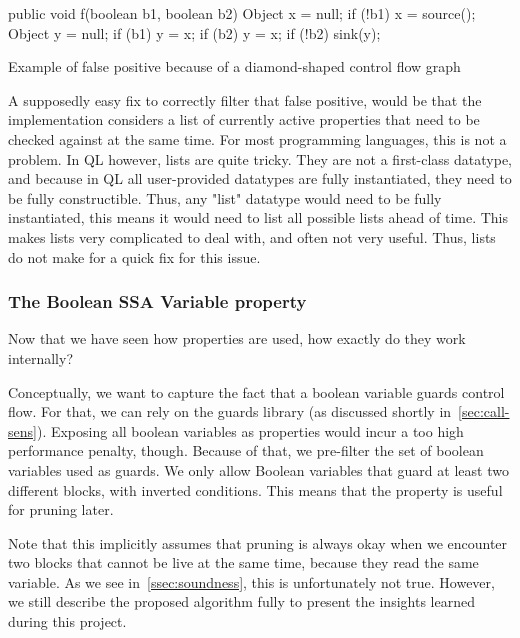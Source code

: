 \begin{listing}
    \begin{javacode}
public void f(boolean b1, boolean b2) {
    Object x = null;
    if (!b1) {
        x = source();
    }
    Object y = null;
    if (b1) {
        y = x;
    }
    if (b2) {
        y = x;
    }
    if (!b2) {
        sink(y);
    }
}
    \end{javacode}
    \caption{Example of false positive because of a diamond-shaped control flow graph}
    \label{lst:ps-diamond}
\end{listing}

A supposedly easy fix to correctly filter that false positive,
would be that the implementation considers a list of currently active
properties that need to be checked against at the same time.
For most programming languages, this is not a problem.
In QL however, lists are quite tricky.
They are not a first-class datatype, and because in QL all user-provided datatypes 
are fully instantiated, they need to be fully constructible.
Thus, any "list" datatype would need to be fully instantiated, this means it would
need to list all possible lists ahead of time.
This makes lists very complicated to deal with, and often not very useful.
Thus, lists do not make for a quick fix for this issue.

\subsubsection*{The Boolean SSA Variable property}
Now that we have seen how properties are used, how exactly do they work internally?

Conceptually, we want to capture the fact that a boolean variable guards 
control flow.
For that, we can rely on the guards library (as discussed shortly in~\autoref{sec:call-sens}).
Exposing all boolean variables as properties would incur a too high performance penalty,
though.
Because of that, we pre-filter the set of boolean variables used as guards.
We only allow Boolean variables that guard at least two different blocks,
with inverted conditions.
This means that the property is useful for pruning later.

Note that this implicitly assumes that pruning is always okay when we encounter
two blocks that cannot be live at the same time, because they read the same variable.
As we see in~\autoref{ssec:soundness}, this is unfortunately not true.
However, we still describe the proposed algorithm fully to present the insights
learned during this project.

